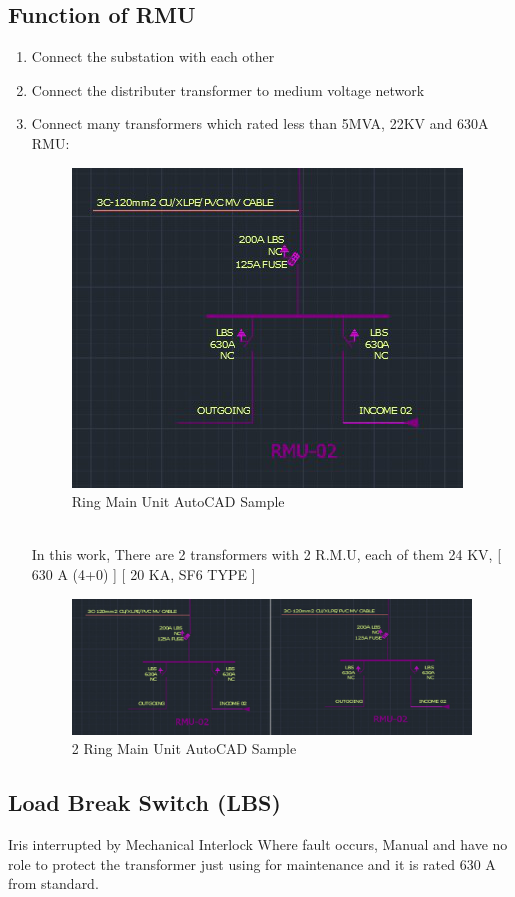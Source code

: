 \documentclass[12pt,fleqn]{book} %
\begin{document}
\subsection {Function of RMU}

\begin{enumerate}
\item  Connect the substation with each other
\item Connect the distributer transformer to medium voltage network
\item Connect many transformers which rated less than 5MVA, 22KV and 630A RMU:
\begin{figure}[h!]
    \centering
    \includegraphics[width=0.5\linewidth]{hamdy 2.png}
    \caption{Ring Main Unit AutoCAD Sample}
    \label{fig:hamdy 2}
\end{figure} \\
In this work, There are  2 transformers with 2 R.M.U, each of them 24 KV, 
[ 630 A (4+0) ]
[ 20 KA, SF6 TYPE ] \\

 \begin{figure}[h!]
    \centering
    \includegraphics[width=1\linewidth]{hamdy 3.png}
    \caption{2 Ring Main Unit AutoCAD Sample}
    \label{fig:hamdy 3}
\end{figure} 

 \end{enumerate}
\subsection{Load Break Switch (LBS)}
Iris interrupted by Mechanical Interlock Where fault occurs, Manual and have no role to protect the transformer just using for maintenance and it is rated 630 A from standard.
\end{document}
